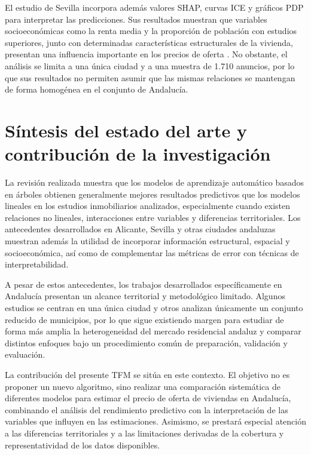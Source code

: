 \documentclass[IB]{TFUOC}%
\begin{document}
El estudio de Sevilla incorpora además valores SHAP, curvas ICE y gráficos PDP para interpretar las predicciones. Sus resultados muestran que variables socioeconómicas como la renta media y la proporción de población con estudios superiores, junto con determinadas características estructurales de la vivienda, presentan una influencia importante en los precios de oferta \cite{gutierrez2026sevilla}. No obstante, el análisis se limita a una única ciudad y a una muestra de 1.710 anuncios, por lo que sus resultados no permiten asumir que las mismas relaciones se mantengan de forma homogénea en el conjunto de Andalucía.

\section{Síntesis del estado del arte y contribución de la investigación}

La revisión realizada muestra que los modelos de aprendizaje automático basados en árboles obtienen generalmente mejores resultados predictivos que los modelos lineales en los estudios inmobiliarios analizados, especialmente cuando existen relaciones no lineales, interacciones entre variables y diferencias territoriales. Los antecedentes desarrollados en Alicante, Sevilla y otras ciudades andaluzas muestran además la utilidad de incorporar información estructural, espacial y socioeconómica, así como de complementar las métricas de error con técnicas de interpretabilidad.

A pesar de estos antecedentes, los trabajos desarrollados específicamente en Andalucía presentan un alcance territorial y metodológico limitado. Algunos estudios se centran en una única ciudad y otros analizan únicamente un conjunto reducido de municipios, por lo que sigue existiendo margen para estudiar de forma más amplia la heterogeneidad del mercado residencial andaluz y comparar distintos enfoques bajo un procedimiento común de preparación, validación y evaluación.

La contribución del presente TFM se sitúa en este contexto. El objetivo no es proponer un nuevo algoritmo, sino realizar una comparación sistemática de diferentes modelos para estimar el precio de oferta de viviendas en Andalucía, combinando el análisis del rendimiento predictivo con la interpretación de las variables que influyen en las estimaciones. Asimismo, se prestará especial atención a las diferencias territoriales y a las limitaciones derivadas de la cobertura y representatividad de los datos disponibles.
\end{document}
